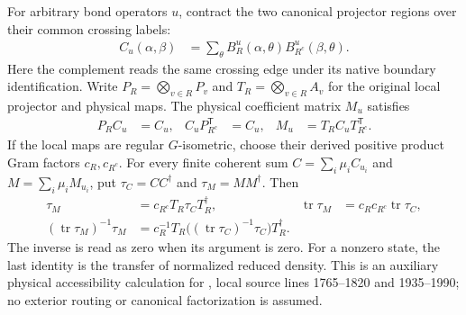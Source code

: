 \begin{lemma}%
    \label{thm:peps_regular_physical_cut_transfer}
    \leanok
    For arbitrary bond operators $u$, contract the two canonical
    projector regions over their common crossing labels:
    \begin{align}
        C_u(\alpha,\beta)
         & =\sum_\theta B_R^u(\alpha,\theta)
        B_{R^c}^u(\beta,\theta).
    \end{align}
    Here the complement reads the same crossing edge under its native
    boundary identification. Write $P_R=\bigotimes_{v\in R}P_v$ and
    $T_R=\bigotimes_{v\in R}A_v$ for the original local projector and
    physical maps. The physical coefficient matrix $M_u$ satisfies
    \begin{align}
        P_R C_u & =C_u,                        & C_uP_{R^c}^{\mathsf T} & =C_u, &
        M_u     & =T_R C_uT_{R^c}^{\mathsf T}.
    \end{align}
    If the local maps are regular $G$-isometric, choose their derived
    positive product Gram factors $c_R,c_{R^c}$. For every finite coherent
    sum $C=\sum_i\mu_iC_{u_i}$ and $M=\sum_i\mu_iM_{u_i}$, put
    $\tau_C=CC^\dagger$ and $\tau_M=MM^\dagger$. Then
    \begin{align}
        \tau_M & =c_{R^c}T_R\tau_CT_R^\dagger,       &
        \operatorname{tr}\tau_M
               & =c_Rc_{R^c}\operatorname{tr}\tau_C,   \\
        (\operatorname{tr}\tau_M)^{-1}\tau_M
               & =c_R^{-1}T_R
        \bigl((\operatorname{tr}\tau_C)^{-1}\tau_C\bigr)T_R^\dagger.
    \end{align}
    The inverse is read as zero when its argument is zero. For a nonzero
    state, the last identity is the transfer of normalized reduced density.
    This is an auxiliary physical accessibility calculation for
    \cite[Theorem~6.9]{Schuch2010PEPS}, local source lines 1765--1820 and
    1935--1990; no exterior routing or canonical factorization is assumed.
\end{lemma}

